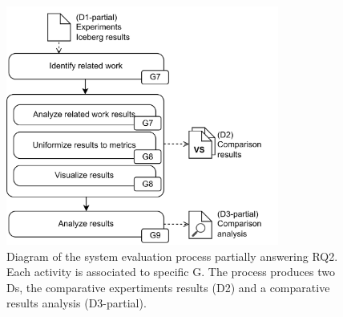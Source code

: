 \begin{figure}[!ht]
    \begin{center}
    \includegraphics[width=0.8\textwidth]{figures/3-method/method_comp.png}
    \caption[System evaluation process - Iceberg vs. Delta Lake]{Diagram of the system evaluation process partially answering \gls{RQ}2. Each activity is associated to specific \gls{G}. The process produces two \glspl{D}, the comparative expertiments results (\gls{D}2) and a comparative results analysis (\gls{D}3-partial).}
    \label{fig:method_comparison}
    \end{center}
\end{figure}